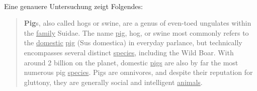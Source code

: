 \paragraph{}
Eine genauere Untersuchung zeigt Folgendes:

\begin{quote}
\textbf{Pig}s, also called hogs or swine, are a genus of even-toed ungulates within the \underline{family} Suidae.
The name \underline{pig}, hog, or swine most commonly refers to the \underline{domestic} \underline{pig} (Sus domestica) in everyday parlance, but technically encompasses several distinct \underline{species}, including the Wild Boar.
With around 2 billion on the planet, domestic \underline{pigs} are also by far the most numerous pig \underline{species}. Pigs are omnivores, and despite their reputation for gluttony, they are generally social and intelligent \underline{animals}.
\end{quote}

